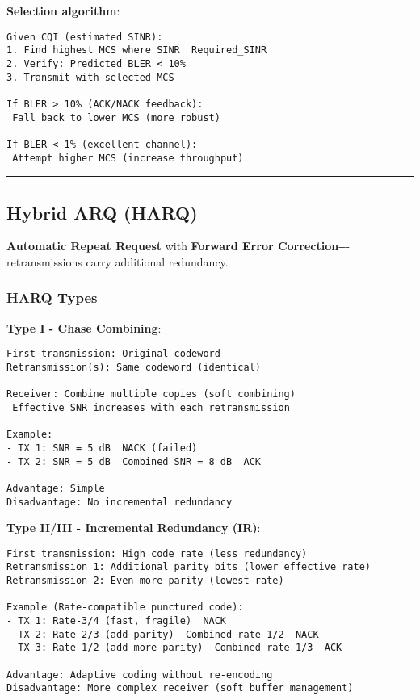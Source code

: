\textbf{Selection algorithm}:

\begin{verbatim}
Given CQI (estimated SINR):
1. Find highest MCS where SINR  Required_SINR
2. Verify: Predicted_BLER < 10%
3. Transmit with selected MCS

If BLER > 10% (ACK/NACK feedback):
 Fall back to lower MCS (more robust)

If BLER < 1% (excellent channel):
 Attempt higher MCS (increase throughput)
\end{verbatim}

\begin{center}\rule{0.5\linewidth}{0.5pt}\end{center}

\subsection{\texorpdfstring{ Hybrid ARQ
(HARQ)}{ Hybrid ARQ (HARQ)}}\label{hybrid-arq-harq}

\textbf{Automatic Repeat Request} with \textbf{Forward Error
Correction}-\/-\/-retransmissions carry additional redundancy.

\subsubsection{HARQ Types}\label{harq-types}

\textbf{Type I - Chase Combining}:

\begin{verbatim}
First transmission: Original codeword
Retransmission(s): Same codeword (identical)

Receiver: Combine multiple copies (soft combining)
 Effective SNR increases with each retransmission

Example:
- TX 1: SNR = 5 dB  NACK (failed)
- TX 2: SNR = 5 dB  Combined SNR = 8 dB  ACK 

Advantage: Simple
Disadvantage: No incremental redundancy
\end{verbatim}

\textbf{Type II/III - Incremental Redundancy (IR)}:

\begin{verbatim}
First transmission: High code rate (less redundancy)
Retransmission 1: Additional parity bits (lower effective rate)
Retransmission 2: Even more parity (lowest rate)

Example (Rate-compatible punctured code):
- TX 1: Rate-3/4 (fast, fragile)  NACK
- TX 2: Rate-2/3 (add parity)  Combined rate-1/2  NACK
- TX 3: Rate-1/2 (add more parity)  Combined rate-1/3  ACK 

Advantage: Adaptive coding without re-encoding
Disadvantage: More complex receiver (soft buffer management)
\end{verbatim}


